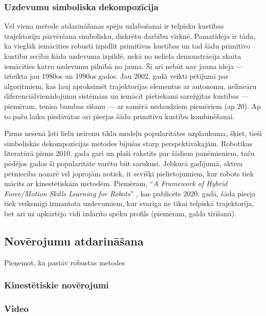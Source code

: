 \documentclass[12pt, a4paper]{article}
\numberwithin{equation}{section} %
\begin{document}
\subsubsection{Uzdevumu simboliska dekompozīcija}

Vēl viena metode atdarināšanas spēju uzlabošanai ir telpisku kustības trajektoriju pārvēršana simbolisku, diskrētu darbību virknē. Pamatideja ir tāda, ka vieglāk iemācīties robusti izpidlīt primitīvas kustības un tad šādu primitīvo kustību secību kāda uzdevuma izpildē, nekā no neliela demonstrācija skaita iemācīties katru uzdevumu pilnībā no jauna. Šī arī nebūt nav jauna ideja --- izteikta jau 1980os un 1990os gados\cite{muench1994robot}. Jau 2002. gadā veikti pētījumi par algoritmiem, kas ļauj aproksimēt trajektorijas elementus ar autonomu, nelineāru diferenciālvienādojumu sistēmām\cite{ijspeert2002movement} un iemācīt pietiekami sarežģītas kustības --- piemēram, tenisa bumbas sišanu --- ar samērā nedaudziem piemēriem (ap 20). Ap to pašu laiku piedāvātas arī pieejas šādu primitīvu kustību kombinēšanai\cite{schaal2003computational}.

Pirms nesenā ļoti lielu neironu tīklu modeļu popularitātes uzplaukuma, šķiet, tieši simboliskās dekompozīcijas metodes bijušas starp perspektīvākajām. Robotikas literatūrā pirms 2010. gada\cite{billard2008handbook} gari un plaši rakstīts par šādiem paņēmieniem, taču pēdējos gados šī popularitāte varētu būt sarukusi. Jebkurā gadījumā, aktīva pētniecība nozarē vēl joprojām notiek, it sevišķi pielietojumiem, kur robots tiek mācīts ar kinestētiskām metodēm. Piemēram, ``\textit{A Framework of Hybrid Force/Motion Skills Learning for Robots}'' \cite{wang2020framework}, kas publicēts 2020. gadā, šāda pieeja tiek veiksmīgi izmantota uzdevumiem, kur svarīga ne tikai telpiskā trajektorija, bet arī uz apkārtējo vidi izdarīto spēku profils (piemēram, galda tīrīšanā).


\subsection{Novērojumu atdarināšana}

Pieņemot, ka pastāv robustas metodes 

\subsubsection{Kinestētiskie novērojumi}

\subsubsection{Video}
\end{document}
